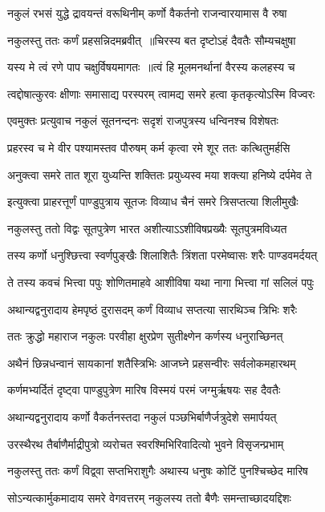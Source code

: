 \twolineshloka
{नकुलं रभसं युद्धे द्रावयन्तं वरूथिनीम्}
{कर्णो वैकर्तनो राजन्वारयामास वै रुषा}


\twolineshloka
{नकुलस्तु ततः कर्णं प्रहसन्निदमब्रवीत् ॥चिरस्य बत दृष्टोऽहं दैवतैः सौम्यचक्षुषा}
{}


\twolineshloka
{यस्य मे त्वं रणे पाप चक्षुर्विषयमागतः ॥त्वं हि मूलमनर्थानां वैरस्य कलहस्य च}
{}


\twolineshloka
{त्वद्दोषात्कुरवः क्षीणाः समासाद्य परस्परम्}
{त्वामद्य समरे हत्वा कृतकृत्योऽस्मि विज्वरः}


\twolineshloka
{एवमुक्तः प्रत्युवाच नकुलं सूतनन्दनः}
{सदृशं राजपुत्रस्य धन्विनश्च विशेषतः}


\twolineshloka
{प्रहरस्व च मे वीर पश्यामस्तव पौरुषम्}
{कर्म कृत्वा रमे शूर ततः कत्थितुमर्हसि}


\twolineshloka
{अनुक्त्वा समरे तात शूरा युध्यन्ति शक्तितः}
{प्रयुध्यस्व मया शक्त्या हनिष्ये दर्पमेव ते}


\twolineshloka
{इत्युक्त्वा प्राहरत्तूर्णं पाण्डुपुत्राय सूतजः}
{विव्याध चैनं समरे त्रिसप्तत्या शिलीमुखैः}


\twolineshloka
{नकुलस्तु ततो विद्वः सूतपुत्रेण भारत}
{अशीत्याऽऽशीविषप्रख्यैः सूतपुत्रमविध्यत}


\twolineshloka
{तस्य कर्णो धनुश्छित्त्वा स्वर्णपुङ्खैः शिलाशितैः}
{त्रिंशता परमेष्वासः शरैः पाण्डवमर्दयत्}


\twolineshloka
{ते तस्य कवचं भित्त्वा पपुः शोणितमाहवे}
{आशीविषा यथा नागा भित्त्वा गां सलिलं पपुः}


\twolineshloka
{अथान्यद्वनुरादाय हेमपृष्ठं दुरासदम्}
{कर्णं विव्याध सप्तत्या सारथिञ्च त्रिभिः शरैः}


\twolineshloka
{ततः क्रुद्धो महाराज नकुलः परवीहा}
{क्षुरप्रेण सुतीक्ष्णेन कर्णस्य धनुराच्छिनत्}


\twolineshloka
{अथैनं छिन्नधन्वानं सायकानां शतैस्त्रिभिः}
{आजघ्ने प्रहसन्वीरः सर्वलोकमहारथम्}


\twolineshloka
{कर्णमभ्यर्दितं दृष्ट्वा पाण्डुपुत्रेण मारिष}
{विस्मयं परमं जग्मुर्ऋषयः सह दैवतैः}


\twolineshloka
{अथान्यद्वनुरादाय कर्णो वैकर्तनस्तदा}
{नकुलं पञ्छभिर्बाणैर्जत्रुदेशे समार्पयत्}


\twolineshloka
{उरस्थैरथ तैर्बाणैर्माद्रीपुत्रो व्यरोचत}
{स्वरश्मिभिरिवादित्यो भुवने विसृजन्प्रभाम्}


\twolineshloka
{नकुलस्तु ततः कर्णं विद्व्वा सप्तभिराशुगैः}
{अथास्य धनुषः कोटिं पुनश्चिच्छेद मारिष}


\twolineshloka
{सोऽन्यत्कार्मुकमादाय समरे वेगवत्तरम्}
{नकुलस्य ततो बैणैः समन्ताच्छादयद्दिशः}


